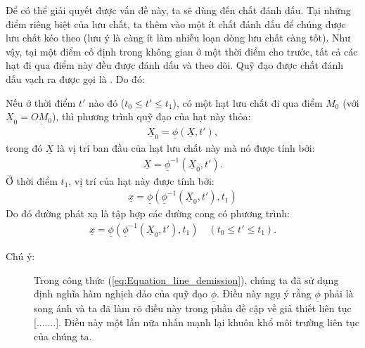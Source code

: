 \documentclass[../../../main.tex]{subfiles}
\begin{document}
		Để có thể giải quyết được vấn đề này, ta sẽ dùng đến chất đánh dấu. Tại những điểm riêng biệt của lưu chất, ta thêm vào một ít chất đánh dấu để chúng được lưu chất kéo theo (lưu ý là càng ít làm nhiễu loạn dòng lưu chất càng tốt). Như vậy, tại một điểm cố định trong không gian ở một thời điểm cho trước, tất cả các hạt đi qua điểm này đều được đánh dấu và theo dõi. Quỹ đạo được chất đánh dấu vạch ra được gọi là . Do đó:
			\begin{quotation}
			\end{quotation}
		Nếu ở thời điểm $t'$ nào đó ($t_0\le t'\le t_1$), có một hạt lưu chất đi qua điểm $M_0$ (với $\underline{X}_0=\underline{OM_0}$), thì phương trình quỹ đạo của hạt này thỏa:
			\begin{align}
				\underline{X}_0=\underline{\phi}\left(\underline{X},t'\right),
			\end{align}
trong đó $\underline{X}$ là vị trí ban đầu của hạt lưu chất này mà nó được tính bởi:
			\begin{align}
				\underline{X}=\underline{\phi}^{-1}\left(\underline{X}_0,t'\right).
			\end{align}
Ở thời điểm $t_1$, vị trí của hạt này được tính bởi:
			\begin{align}
				\underline{x}=\underline{\phi}\left(\underline{\phi}^{-1}\left(\underline{X}_0,t'\right),t_1\right)
			\end{align}
		Do đó đường phát xạ là tập hợp các đường cong có phương trình:
			\begin{align}\label{eq:Equation_line_demission}
				\boxed{\underline{x}=\underline{\phi}\left(\underline{\phi}^{-1}\left(\underline{X}_0,t'\right),t_1\right)\quad(t_0\le t'\le t_1)}.
			\end{align}
		\begin{description}
			\item[Chú ý:] Trong công thức (\ref{eq:Equation_line_demission}), chúng ta đã sử dụng định nghĩa hàm nghịch đảo của quỹ đạo $\underline{\phi}$. Điều này ngụ ý rằng $\underline{\phi}$ phải là song ánh và ta đã làm rõ điều này trong phần đề cập về giả thiết liên tục [.......]. Điều này một lần nữa nhấn mạnh lại khuôn khổ môi trường liên tục của chúng ta.
		\end{description}
\end{document}
